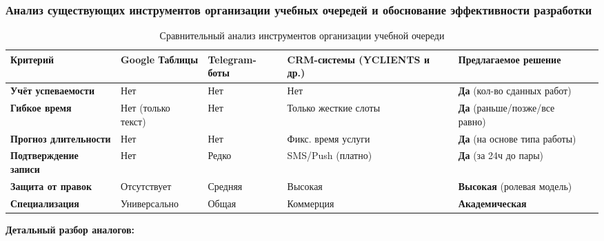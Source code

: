 \subsubsection{Анализ существующих инструментов организации учебных очередей и обоснование эффективности разработки}

\begin{table}[ht!]
    \centering
    \caption{Сравнительный анализ инструментов организации учебной очереди}
    \label{tab:queue_tools}
    \small 
    \begin{tabularx}{\textwidth}{l|p{2cm}|p{2cm}|p{2cm}|p{2.5cm}|p{2.5cm}}
        \toprule
        \textbf{Критерий} & \textbf{Google Таблицы} & \textbf{Telegram-боты} & \textbf{CRM-системы (YCLIENTS и др.)} & \textbf{Предлагаемое решение} \\
        \midrule
        \textbf{Учёт успеваемости} & Нет & Нет & Нет & \textbf{Да} (кол-во сданных работ) \\
        \midrule
        \textbf{Гибкое время} & Нет (только текст) & Нет & Только жесткие слоты & \textbf{Да} (раньше/позже/все равно) \\
        \midrule
        \textbf{Прогноз длительности} & Нет & Нет & Фикс. время услуги & \textbf{Да} (на основе типа работы) \\
        \midrule
        \textbf{Подтверждение записи} & Нет & Редко & SMS/Push (платно) & \textbf{Да} (за 24ч до пары) \\
        \midrule
        \textbf{Защита от правок} & Отсутствует & Средняя & Высокая & \textbf{Высокая} (ролевая модель) \\
        \midrule
        \textbf{Специализация} & Универсально & Общая & Коммерция & \textbf{Академическая} \\
        \bottomrule
    \end{tabularx}
\end{table}

\textbf{Детальный разбор аналогов:}

